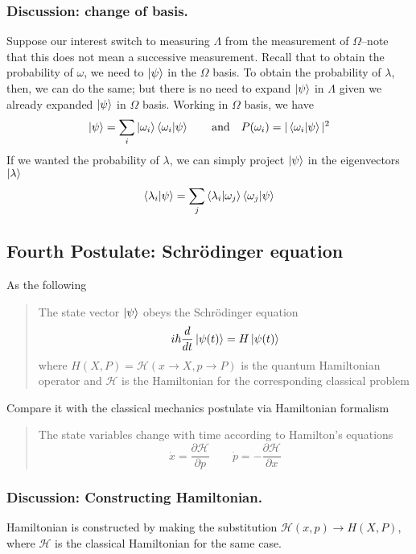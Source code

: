 \documentclass[../../../main.tex]{subfiles}
\begin{document}
\subsubsection{Discussion: change of basis.}
Suppose our interest switch to measuring $\Lambda$ from the measurement of $\Omega$--note that this does not mean a successive measurement.
Recall that to obtain the probability of $\omega$, we need to $\ket{\psi}$ in the $\Omega$ basis.
To obtain the probability of $\lambda$, then, we can do the same; but there is no need to expand $\ket{\psi}$ in $\Lambda$ given we already expanded $\ket{\psi}$ in $\Omega$ basis.
Working in $\Omega$ basis, we have 
\begin{equation*}
    \ket{\psi }=\sum_i \ket{\omega_i } \braket{\omega_i |\psi}\qquad\text{and}\quad P(\omega_i)=|\braket{\omega_i|\psi}|^2
\end{equation*}
If we wanted the probability of $\lambda$, we can simply project $\ket{\psi}$ in the eigenvectors $\ket{\lambda}$
\begin{equation*}
    \braket{\lambda_i|\psi}=\sum_j \braket{\lambda_i|\omega_j}\braket{\omega_j|\psi}
\end{equation*}


\subsection{Fourth Postulate: Schrödinger equation}
As the following
\begin{quotation}
    The state vector $\ket{\psi}$ obeys the Schrödinger equation
    \begin{equation*}
        i\hbar \frac{d }{dt }\ket{\psi(t )}= H \ket{\psi(t)}
    \end{equation*}
    where $H(X,P)=\mathcal{H }(x\rightarrow X, p\rightarrow P  )$ is the quantum Hamiltonian operator and $\mathcal{H }$ is the Hamiltonian for the corresponding classical problem
\end{quotation}
Compare it with the classical mechanics postulate via Hamiltonian formalism
\begin{quotation}
The state variables change with time according to Hamilton's equations
\begin{equation*}
    \dot{x}=\frac{\partial \mathcal{H }}{\partial p}\qquad \dot{p }=-\frac{\partial \mathcal{H }}{\partial x}
\end{equation*}
\end{quotation}

\subsubsection{Discussion: Constructing Hamiltonian.}
Hamiltonian is constructed by making the substitution $\mathcal{H}(x,p) \rightarrow H(X,P)$, where $\mathcal{H }$ is the classical Hamiltonian for the same case.
\end{document}
